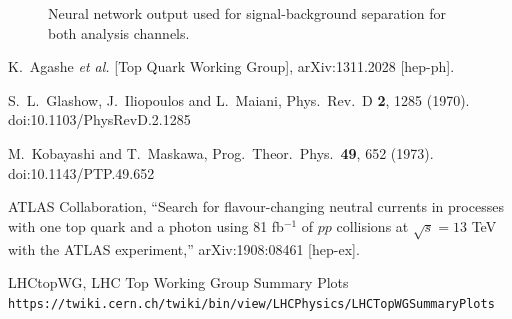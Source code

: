 \documentclass[12pt,letterpaper]{article}
\begin{document}
\begin{figure}[]
\centering
{}\hfil
{}
\caption{Neural network output used for signal-background separation for both analysis channels.}
\label{fig:FCNCSep}
\end{figure}

\begin{thebibliography}{9}
  K.~Agashe {\it et al.} [Top Quark Working Group],
  arXiv:1311.2028 [hep-ph].

  S.~L.~Glashow, J.~Iliopoulos and L.~Maiani,
  Phys.\ Rev.\ D {\bf 2}, 1285 (1970).
  doi:10.1103/PhysRevD.2.1285

  M.~Kobayashi and T.~Maskawa,
  Prog.\ Theor.\ Phys.\  {\bf 49}, 652 (1973).
  doi:10.1143/PTP.49.652



  ATLAS Collaboration, 
  ``Search for flavour-changing neutral currents in
                        processes with one top quark and a photon using 81
                        fb$^{-1}$ of $pp$ collisions at $\sqrt{s} = 13$ TeV with
                        the ATLAS experiment,''
  arXiv:1908:08461 [hep-ex].

LHCtopWG, LHC Top Working Group Summary Plots
\\\texttt{https://twiki.cern.ch/twiki/bin/view/LHCPhysics/LHCTopWGSummaryPlots}
\end{thebibliography}
\end{document}
